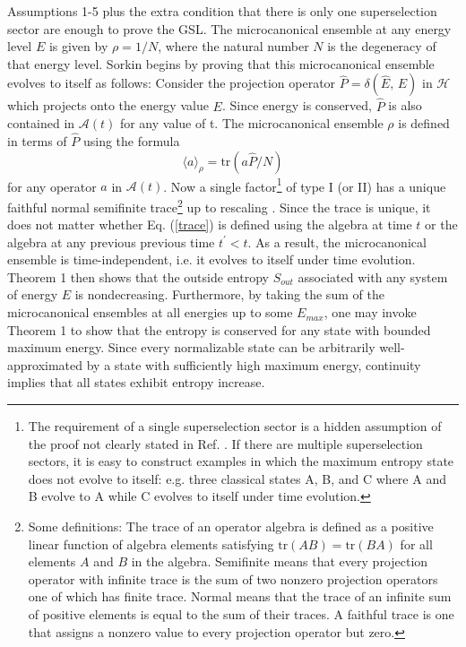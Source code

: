 \documentclass{article}
\begin{document}
Assumptions 1-5 plus the extra condition that there is only one superselection sector are enough to prove the GSL.  The microcanonical ensemble at any energy level $E$ is given by $\rho = 1/N$, where the natural number $N$ is the degeneracy of that energy level.  Sorkin begins by proving that this microcanonical ensemble evolves to itself as follows:  Consider the projection operator $\hat{P} = \delta (\hat{E},\,E)$ in $\mathcal{H}$ which projects onto the energy value $E$.  Since energy is conserved, $\hat{P}$ is also contained in $\mathcal{A}(t)$ for any value of t.  The microcanonical ensemble $\rho$ is defined in terms of $\hat{P}$ using the formula
\begin{equation}\label{trace}
\langle a \rangle_{\rho} = \mathrm{tr}(a\hat{P}/N)
\end{equation}
for any operator $a$ in $\mathcal{A}(t)$.  Now a single factor\footnote{The requirement of a single superselection sector is a hidden assumption of the proof not clearly stated in Ref. \cite{sorkin86}.  If there are multiple superselection sectors, it is easy to construct examples in which the maximum entropy state does not evolve to itself: e.g. three classical states A, B, and C where A and B evolve to A while C evolves to itself under time evolution.} of type I (or II) has a unique faithful normal semifinite trace\footnote{Some definitions: The trace of an operator algebra is defined as a positive linear function of algebra elements satisfying $\mathrm{tr}(AB) = \mathrm{tr}(BA)$ for all elements $A$ and $B$ in the algebra.  Semifinite means that every projection operator with infinite trace is the sum of two nonzero projection operators one of which has finite trace.  Normal means that the trace of an infinite sum of positive elements is equal to the sum of their traces.  A faithful trace is one that assigns a nonzero value to every projection operator but zero.} up to rescaling \cite{KR}.  Since the trace is unique, it does not matter whether Eq. (\ref{trace}) is defined using the algebra at time $t$ or the algebra at any previous previous time $t^\prime < t$.  As a result, the microcanonical ensemble is time-independent, i.e. it evolves to itself under time evolution.  Theorem 1 then shows that the outside entropy $S_{out}$ associated with any system of energy $E$ is nondecreasing.  Furthermore, by taking the sum of the microcanonical ensembles at all energies up to some $E_{max}$, one may invoke Theorem 1 to show that the entropy is conserved for any state with bounded maximum energy.  Since every normalizable state can be arbitrarily well-approximated by a state with sufficiently high maximum energy, continuity implies that all states exhibit entropy increase.
\end{document}

